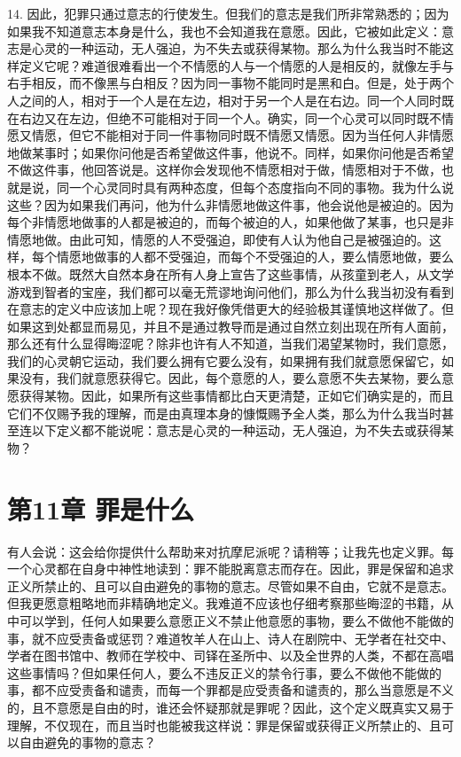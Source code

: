 14. 因此，犯罪只通过意志的行使发生。但我们的意志是我们所非常熟悉的；因为如果我不知道意志本身是什么，我也不会知道我在意愿。因此，它被如此定义：意志是心灵的一种运动，无人强迫，为不失去或获得某物。那么为什么我当时不能这样定义它呢？难道很难看出一个不情愿的人与一个情愿的人是相反的，就像左手与右手相反，而不像黑与白相反？因为同一事物不能同时是黑和白。但是，处于两个人之间的人，相对于一个人是在左边，相对于另一个人是在右边。同一个人同时既在右边又在左边，但绝不可能相对于同一个人。确实，同一个心灵可以同时既不情愿又情愿，但它不能相对于同一件事物同时既不情愿又情愿。因为当任何人非情愿地做某事时；如果你问他是否希望做这件事，他说不。同样，如果你问他是否希望不做这件事，他回答说是。这样你会发现他不情愿相对于做，情愿相对于不做，也就是说，同一个心灵同时具有两种态度，但每个态度指向不同的事物。我为什么说这些？因为如果我们再问，他为什么非情愿地做这件事，他会说他是被迫的。因为每个非情愿地做事的人都是被迫的，而每个被迫的人，如果他做了某事，也只是非情愿地做。由此可知，情愿的人不受强迫，即使有人认为他自己是被强迫的。这样，每个情愿地做事的人都不受强迫，而每个不受强迫的人，要么情愿地做，要么根本不做。既然大自然本身在所有人身上宣告了这些事情，从孩童到老人，从文学游戏到智者的宝座，我们都可以毫无荒谬地询问他们，那么为什么我当初没有看到在意志的定义中应该加上呢？现在我好像凭借更大的经验极其谨慎地这样做了。但如果这到处都显而易见，并且不是通过教导而是通过自然立刻出现在所有人面前，那么还有什么显得晦涩呢？除非也许有人不知道，当我们渴望某物时，我们意愿，我们的心灵朝它运动，我们要么拥有它要么没有，如果拥有我们就意愿保留它，如果没有，我们就意愿获得它。因此，每个意愿的人，要么意愿不失去某物，要么意愿获得某物。因此，如果所有这些事情都比白天更清楚，正如它们确实是的，而且它们不仅赐予我的理解，而是由真理本身的慷慨赐予全人类，那么为什么我当时甚至连以下定义都不能说呢：意志是心灵的一种运动，无人强迫，为不失去或获得某物？\par


\section{第11章 罪是什么}

有人会说：这会给你提供什么帮助来对抗摩尼派呢？请稍等；让我先也定义罪。每一个心灵都在自身中神性地读到：罪不能脱离意志而存在。因此，罪是保留和追求正义所禁止的、且可以自由避免的事物的意志。尽管如果不自由，它就不是意志。但我更愿意粗略地而非精确地定义。我难道不应该也仔细考察那些晦涩的书籍，从中可以学到，任何人如果要么意愿正义不禁止他意愿的事物，要么不做他不能做的事，就不应受责备或惩罚？难道牧羊人在山上、诗人在剧院中、无学者在社交中、学者在图书馆中、教师在学校中、司铎在圣所中、以及全世界的人类，不都在高唱这些事情吗？但如果任何人，要么不违反正义的禁令行事，要么不做他不能做的事，都不应受责备和谴责，而每一个罪都是应受责备和谴责的，那么当意愿是不义的，且不意愿是自由的时，谁还会怀疑那就是罪呢？因此，这个定义既真实又易于理解，不仅现在，而且当时也能被我这样说：罪是保留或获得正义所禁止的、且可以自由避免的事物的意志？\par

